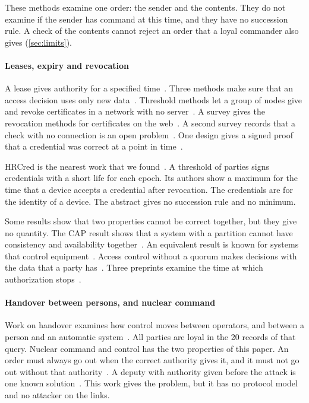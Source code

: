 These methods examine one order: the sender and the contents. They do not examine if the
sender has command at this time, and they have no succession rule. A check of the contents
cannot reject an order that a loyal commander also gives (\cref{sec:limits}).

\paragraph{Leases, expiry and revocation}
A lease gives authority for a specified time~\cite{gray1989leases}. Three methods make sure that an access decision uses only new
data~\cite{stubblebine1995recent,krishnan2008stale,shakarami2019refresh}. Threshold methods
let a group of nodes give and revoke certificates in a network with no
server~\cite{zhou1999securing,luo2004ursa,liu2013ccrvc}. A survey gives the revocation methods for certificates on the
web~\cite{kwon2025revocation}. A second survey records that a check with no connection is
an open problem~\cite{lee2026ssirevocation}. One design gives a signed proof that a
credential was correct at a point in time~\cite{abraham2020revocable}.

HRCred is the nearest work that we found~\cite{zhou2026hrcred}. A threshold of parties
signs credentials with a short life for each epoch. Its authors show a maximum for the time
that a device accepts a credential after revocation. The credentials are for the identity
of a device. The abstract gives no succession rule and no minimum.

Some results show that two properties cannot be correct together, but they give no
quantity. The CAP result shows that a system
with a partition cannot have consistency and availability
together~\cite{gilbert2002cap,brewer2012cap}. An equivalent result is known for systems
that control equipment~\cite{lee2023cal}. Access control without a quorum makes decisions with
the data that a party has~\cite{jacob2025eventually,yanakieva2021impossibility}. Three
preprints examine the time at which authorization
stops~\cite{santosgrueiro2026effect,parakhin2026bureaucracy,deochake2026heartbeat}.

\paragraph{Handover between persons, and nuclear command}
Work on handover examines how control moves between operators, and between a person and an
automatic
system~\cite{flemisch2012balance,abbink2012haptic,grindley2024handover,nilsen2018handing,marot2022perspectives}.
All parties are loyal in the 20 records of that query. Nuclear command and control has the
two properties of this paper. An order must always go out when the correct authority gives it,
and it must not go out without that
authority~\cite{feaver1992guarding,crawford2025nc3}. A deputy with authority given before
the attack is one known solution~\cite{twigge1999learning}. This work gives the problem,
but it has no protocol model and no attacker on the links.

